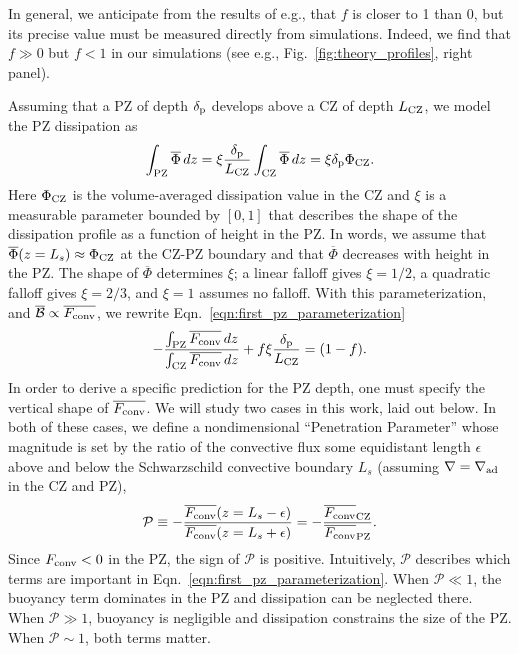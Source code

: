 \documentclass[twocolumn]{aastex631}
\newcommand{\gradad}{\ensuremath{\nabla_{\rm{ad}}}}
\newcommand{\justgrad}{\ensuremath{\nabla}}
\newcommand{\delp}{\ensuremath{\delta_{\rm{p}}}}
\newcommand{\Fconv}{\ensuremath{F_{\rm{conv}}}}
\newcommand{\mP}{\ensuremath{\mathcal{P}}}
\renewcommand{\bar}[1]{\overline{#1}}
\begin{document}
In general, we anticipate from the results of e.g., \citet{currie_browning_2017} that $f$ is closer to 1 than 0, but its precise value must be measured directly from simulations.
Indeed, we find that $f \gg 0$ but $f < 1$ in our simulations (see e.g., Fig.~\ref{fig:theory_profiles}, right panel).

Assuming that a PZ of depth $\delp$ develops above a CZ of depth $L_{\rm{CZ}}$, we model the PZ dissipation as
\begin{equation}
\int_{\rm{PZ}} \bar{\Phi}\,dz = \xi\frac{\delp}{L_{\rm{CZ}}}\int_{\rm{CZ}}\bar{\Phi}\,dz = \xi \delp \Phi_{\rm{CZ}}.
\label{eqn:xi_defn}
\end{equation}
Here $\Phi_{\rm{CZ}}$ is the volume-averaged dissipation value in the CZ and $\xi$ is a measurable parameter bounded by ${[0, 1]}$ that describes the shape of the dissipation profile as a function of height in the PZ.
In words, we assume that $\bar{\Phi}(z = L_s) \approx \Phi_{\rm{CZ}}$ at the CZ-PZ boundary and that $\bar{\Phi}$ decreases with height in the PZ.
The shape of $\bar{\Phi}$ determines $\xi$; a linear falloff gives $\xi = 1/2$, a quadratic falloff gives $\xi = 2/3$, and $\xi = 1$ assumes no falloff.
With this parameterization, and $\bar{\mathcal{B}} \propto \bar{\Fconv}$, we rewrite Eqn.~\ref{eqn:first_pz_parameterization}
\begin{equation}
-\frac{\int_{\rm{PZ}}\bar{\Fconv}\,dz}{\int_{\rm{CZ}}\bar{\Fconv}\,dz} + f\xi\frac{\delp}{L_{\rm{CZ}}}
= (1 - f).
\label{eqn:theory_fraction}
\end{equation}
In order to derive a specific prediction for the PZ depth, one must specify the vertical shape of $\overline{\Fconv}$.
We will study two cases in this work, laid out below.
In both of these cases, we define a nondimensional ``Penetration Parameter'' whose magnitude is set by the ratio of the convective flux some equidistant length $\epsilon$ above and below the Schwarzschild convective boundary $L_s$ (assuming $\justgrad = \gradad$ in the CZ and PZ),
\begin{equation}
\mP \equiv -\frac{\overline{\Fconv}(z = L_s - \epsilon)}{\overline{\Fconv}(z = L_s + \epsilon)}
= -\frac{\bar{\Fconv}_{\rm{CZ}}}{\bar{\Fconv}_{\rm{PZ}}}.
\label{eqn:theory_P_defn}
\end{equation}
Since $\Fconv < 0$ in the PZ, the sign of $\mP$ is positive.
Intuitively, $\mP$ describes which terms are important in Eqn.~\ref{eqn:first_pz_parameterization}.
When $\mP \ll 1$, the buoyancy term dominates in the PZ and dissipation can be neglected there.
When $\mP \gg 1$, buoyancy is negligible and dissipation constrains the size of the PZ.
When $\mP \sim 1$, both terms matter.
\end{document}
